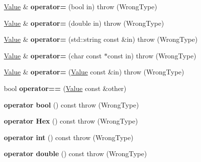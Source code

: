 \begin{DoxyCompactItemize}
\item 
\hypertarget{classValue_a1b8503ac06f2d38d4397563d8938c38d}{\hyperlink{classValue}{Value} \& {\bfseries operator=} (bool in)  throw (\-Wrong\-Type)}\label{classValue_a1b8503ac06f2d38d4397563d8938c38d}

\item 
\hypertarget{classValue_a80b1b8f5ffdb388b1bb05503496001fe}{\hyperlink{classValue}{Value} \& {\bfseries operator=} (double in)  throw (\-Wrong\-Type)}\label{classValue_a80b1b8f5ffdb388b1bb05503496001fe}

\item 
\hypertarget{classValue_aa02130c8e6757fd4bce9935d625734d6}{\hyperlink{classValue}{Value} \& {\bfseries operator=} (std\-::string const \&in)  throw (\-Wrong\-Type)}\label{classValue_aa02130c8e6757fd4bce9935d625734d6}

\item 
\hypertarget{classValue_a4a5b2bc2b05611099604be886c4a7ab2}{\hyperlink{classValue}{Value} \& {\bfseries operator=} (char const $\ast$const in)  throw (\-Wrong\-Type)}\label{classValue_a4a5b2bc2b05611099604be886c4a7ab2}

\item 
\hypertarget{classValue_af798e816bde30926938ff0b4d419f473}{\hyperlink{classValue}{Value} \& {\bfseries operator=} (\hyperlink{classValue}{Value} const \&in)  throw (\-Wrong\-Type)}\label{classValue_af798e816bde30926938ff0b4d419f473}

\item 
\hypertarget{classValue_a83dd7dced02d472f52c180483af4e786}{bool {\bfseries operator==} (\hyperlink{classValue}{Value} const \&other)}\label{classValue_a83dd7dced02d472f52c180483af4e786}

\item 
\hypertarget{classValue_a4a45513291b4b3b43af850e6eb7c6cfc}{{\bfseries operator bool} () const   throw (\-Wrong\-Type)}\label{classValue_a4a45513291b4b3b43af850e6eb7c6cfc}

\item 
\hypertarget{classValue_ab24957cb5a186101cc31b11726c225e2}{{\bfseries operator Hex} () const   throw (\-Wrong\-Type)}\label{classValue_ab24957cb5a186101cc31b11726c225e2}

\item 
\hypertarget{classValue_a5ae69fac4832ec792d82f95643ca3c2f}{{\bfseries operator int} () const   throw (\-Wrong\-Type)}\label{classValue_a5ae69fac4832ec792d82f95643ca3c2f}

\item 
\hypertarget{classValue_af47eaea9ca690c4d84047361446b4b33}{{\bfseries operator double} () const   throw (\-Wrong\-Type)}\label{classValue_af47eaea9ca690c4d84047361446b4b33}


\end{DoxyCompactItemize}
